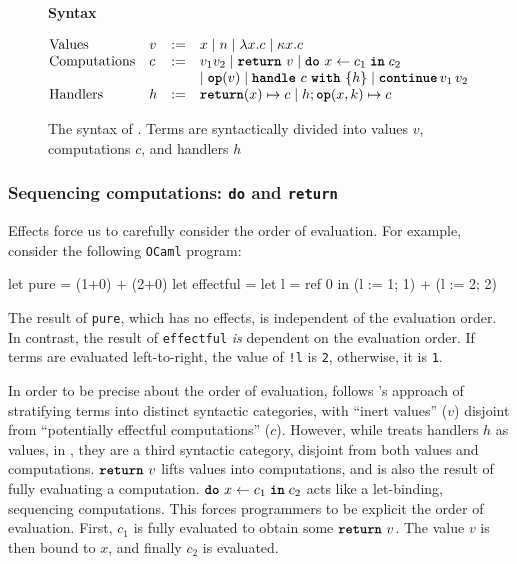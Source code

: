 \begin{figure}
  \begin{eff-desc}
    {\large{\textbf{Syntax}}}
\vspace{2mm}

  $\begin{array}{@{}llll}
  \text{Values} & v & := & x \mid n \mid \lambda x. c \mid \kappa x.c\\

  \text{Computations} & c & := & v_1 v_2 \mid \return{v} \mid \bind{x}{c_1}{c_2} \\
                             &&& \mid \op{v} \mid \handleWith{c}{h} \mid \continue{v_1}{v_2} \\ 
  \text{Handlers} & h & := &\returnHandler{x}{c} \mid h;\opHandler{x}{k}{c}
  \end{array}$
  
  \end{eff-desc}
  \caption{The syntax of \efflang. Terms are syntactically divided into values $v$, computations $c$, and handlers $h$ }
  \label{fig:eff-lang-syntax}
\end{figure}

\subsubsection{Sequencing computations: \texttt{do} and \texttt{return}}
Effects force us to carefully consider the order of evaluation. For example, consider the following \texttt{OCaml} program:
\begin{ocaml}
let pure      = (1+0) + (2+0)
let effectful = let l = ref 0 in (l := 1; 1) + (l := 2; 2)
\end{ocaml}
The result of \texttt{pure}, which has no effects, is independent of the evaluation order. In contrast, the result of \texttt{effectful} \textit{is} dependent on the evaluation order. If terms are evaluated left-to-right, the value of \texttt{!l} is \texttt{2}, otherwise, it is \texttt{1}.

In order to be precise about the order of evaluation, \efflang{} follows \citeauthor{pretnar-15}'s approach of stratifying terms into distinct syntactic categories, with ``inert values'' ($v$) disjoint from ``potentially effectful computations'' ($c$). However, while \citeauthor{pretnar-15} treats handlers $h$ as values, in \efflang{}, they are a third syntactic category, disjoint from both values and computations. $\texttt{\textbf{return}} \,\, {v}$ lifts values into computations, and is also the result of fully evaluating a computation. $\texttt{\textbf{do}} \,\, {x} \leftarrow {c_1} \; \textbf{\texttt{in}} \; {c_2}$ acts like a let-binding, sequencing computations. This forces programmers to be explicit the order of evaluation.  First, $c_1$ is fully evaluated to obtain some $\texttt{\textbf{return}} \,\, {v}$. The value $v$ is then bound to $x$, and finally $c_2$ is evaluated. 

